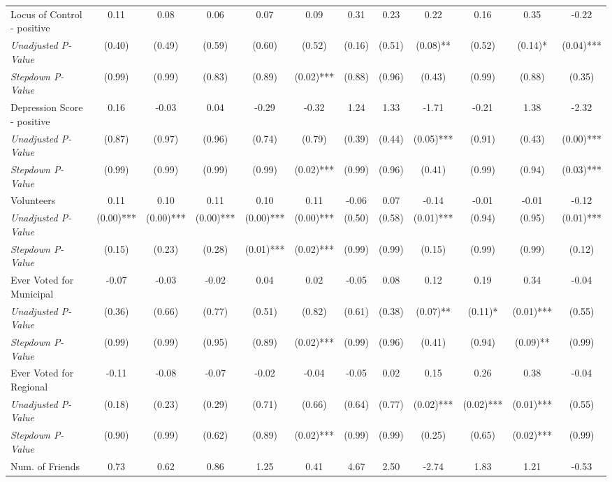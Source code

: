 \begin{tabular}{l c c c c c c c c c c c}
Locus of Control - positive & 0.11 & 0.08 & 0.06 & 0.07 & 0.09 & 0.31 & 0.23 & 0.22 & 0.16 & 0.35 & -0.22 \\
\quad \textit{Unadjusted P-Value} & (0.40) & (0.49) & (0.59) & (0.60) & (0.52) & (0.16) & (0.51) & (0.08)** & (0.52) & (0.14)* & (0.04)*** \\
\quad \textit{Stepdown P-Value} & (0.99) & (0.99) & (0.83) & (0.89) & (0.02)*** & (0.88) & (0.96) & (0.43) & (0.99) & (0.88) & (0.35) \\
Depression Score - positive & 0.16 & -0.03 & 0.04 & -0.29 & -0.32 & 1.24 & 1.33 & -1.71 & -0.21 & 1.38 & -2.32 \\
\quad \textit{Unadjusted P-Value} & (0.87) & (0.97) & (0.96) & (0.74) & (0.79) & (0.39) & (0.44) & (0.05)*** & (0.91) & (0.43) & (0.00)*** \\
\quad \textit{Stepdown P-Value} & (0.99) & (0.99) & (0.99) & (0.99) & (0.02)*** & (0.99) & (0.96) & (0.41) & (0.99) & (0.94) & (0.03)*** \\
Volunteers & 0.11 & 0.10 & 0.11 & 0.10 & 0.11 & -0.06 & 0.07 & -0.14 & -0.01 & -0.01 & -0.12 \\
\quad \textit{Unadjusted P-Value} & (0.00)*** & (0.00)*** & (0.00)*** & (0.00)*** & (0.00)*** & (0.50) & (0.58) & (0.01)*** & (0.94) & (0.95) & (0.01)*** \\
\quad \textit{Stepdown P-Value} & (0.15) & (0.23) & (0.28) & (0.01)*** & (0.02)*** & (0.99) & (0.99) & (0.15) & (0.99) & (0.99) & (0.12) \\
Ever Voted for Municipal & -0.07 & -0.03 & -0.02 & 0.04 & 0.02 & -0.05 & 0.08 & 0.12 & 0.19 & 0.34 & -0.04 \\
\quad \textit{Unadjusted P-Value} & (0.36) & (0.66) & (0.77) & (0.51) & (0.82) & (0.61) & (0.38) & (0.07)** & (0.11)* & (0.01)*** & (0.55) \\
\quad \textit{Stepdown P-Value} & (0.99) & (0.99) & (0.95) & (0.89) & (0.02)*** & (0.99) & (0.96) & (0.41) & (0.94) & (0.09)** & (0.99) \\
Ever Voted for Regional & -0.11 & -0.08 & -0.07 & -0.02 & -0.04 & -0.05 & 0.02 & 0.15 & 0.26 & 0.38 & -0.04 \\
\quad \textit{Unadjusted P-Value} & (0.18) & (0.23) & (0.29) & (0.71) & (0.66) & (0.64) & (0.77) & (0.02)*** & (0.02)*** & (0.01)*** & (0.55) \\
\quad \textit{Stepdown P-Value} & (0.90) & (0.99) & (0.62) & (0.89) & (0.02)*** & (0.99) & (0.99) & (0.25) & (0.65) & (0.02)*** & (0.99) \\
Num. of Friends & 0.73 & 0.62 & 0.86 & 1.25 & 0.41 & 4.67 & 2.50 & -2.74 & 1.83 & 1.21 & -0.53 \\

\end{tabular}
